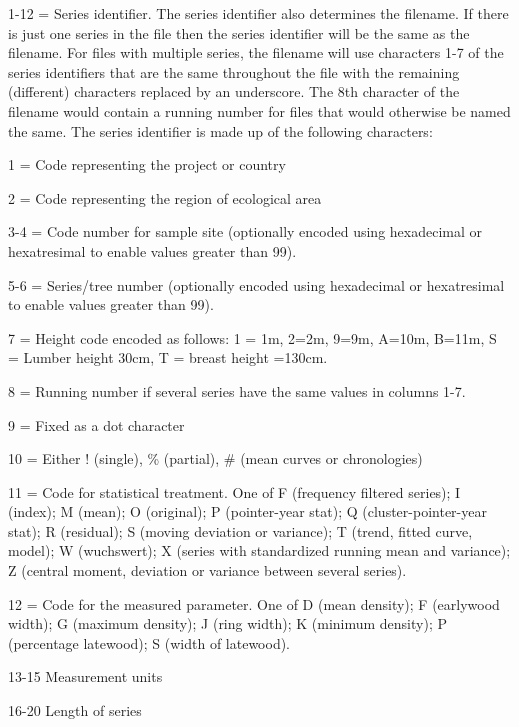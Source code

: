 \begin{itemize*}
 \item 1-12 = Series identifier. The series identifier also determines the filename. If there is just one series in the file then the series identifier will be the same as the filename. For files with multiple series, the filename will use characters 1-7 of the series identifiers that are the same throughout the file with the remaining (different) characters replaced by an underscore. The 8th character of the filename would contain a running number for files that would otherwise be named the same. The series identifier is made up of the following characters: 
  \begin{itemize*}
  \item 1 = Code representing the project or country
  \item  2 = Code representing the region of ecological area
  \item  3-4 = Code number for sample site (optionally encoded using hexadecimal or hexatresimal to enable values greater than 99).
  \item  5-6 = Series/tree number (optionally encoded using hexadecimal or hexatresimal to enable values greater than 99).
  \item  7 = Height code encoded as follows: 1 = 1m, 2=2m, 9=9m, A=10m, B=11m, S = Lumber height 30cm, T = breast height =130cm.
  \item  8 = Running number if several series have the same values in columns 1-7.
  \item  9 = Fixed as a dot character
  \item  10 = Either ! (single), \% (partial), \# (mean curves or chronologies)
  \item  11 = Code for statistical treatment. One of F (frequency filtered series); I (index); M (mean); O (original); P (pointer-year stat); Q (cluster-pointer-year stat); R (residual); S (moving deviation or variance); T (trend, fitted curve, model); W (wuchswert); X (series with standardized running mean and variance); Z (central moment, deviation or variance between several series).
  \item  12 = Code for the measured parameter. One of D (mean density); F (earlywood width); G (maximum density); J (ring width); K (minimum density); P (percentage latewood); S (width of latewood). 
  \end{itemize*}
\item  13-15 Measurement units
\item  16-20 Length of series

\end{itemize*}
